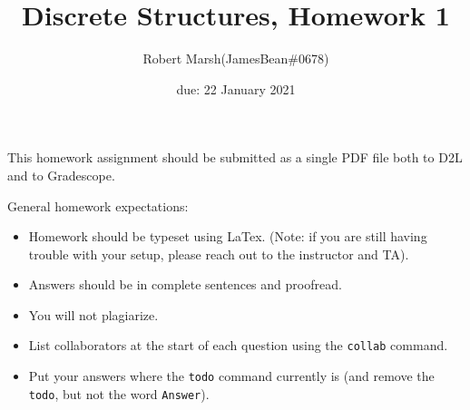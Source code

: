\documentclass{article}
\title{Discrete Structures, Homework 1}
\author{Robert Marsh(JamesBean\#0678)}
\date{due: 22 January 2021}
\begin{document}
\maketitle

This homework assignment should be
submitted as a single PDF file both to D2L and to Gradescope.

General homework expectations:
\begin{itemize}
    \item Homework should be typeset using LaTex.  (Note: if you are still
        having trouble with your setup, please reach out to the instructor and
        TA).
    \item Answers should be in complete sentences and proofread.
    \item You will not plagiarize.
    \item List collaborators at the start of each question using the
        \texttt{collab} command.
    \item Put your answers where the \texttt{todo} command currently is (and
        remove the \texttt{todo}, but not the word \texttt{Answer}).
\end{itemize}

\end{document}
